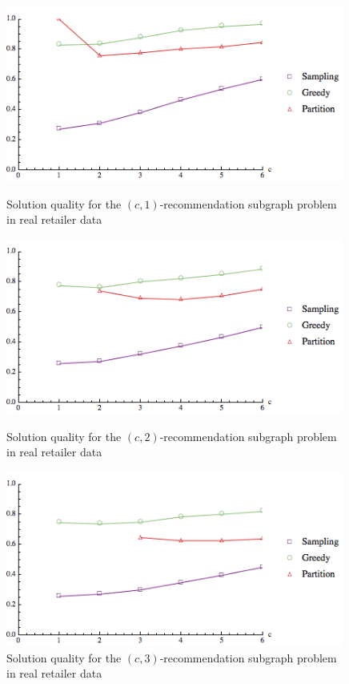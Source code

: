 \begin{figure}[h]
\centering
\begin{minipage}[h]{0.48\textwidth}
\centering
\includegraphics[width=0.99\textwidth]{images/real_a=1.png}
\caption{Solution quality for the $(c, 1)$-recommendation subgraph problem in real retailer data }\label{fig:real_a=1}
\end{minipage}

\hspace{0cm}
\begin{minipage}[h]{0.48\textwidth}
\centering
\includegraphics[width=0.99\textwidth]{images/real_a=2.png}
\caption{Solution quality for the $(c, 2)$-recommendation subgraph problem in real retailer data}\label{fig:real_a=2}
\end{minipage}

\hspace{0cm}
\begin{minipage}[h]{0.48\textwidth}
\centering
\includegraphics[width=0.99\textwidth]{images/real_a=3.png}
\caption{Solution quality for the $(c, 3)$-recommendation subgraph problem in real retailer data}\label{fig:real_a=3}
\end{minipage}
\vspace{-0.2cm}
\end{figure}


